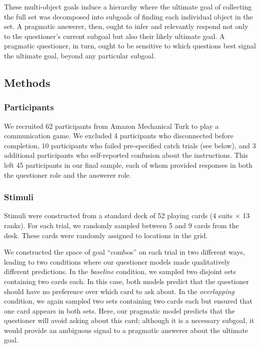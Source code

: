\documentclass[11pt, floatsintext]{apa6}
\begin{document}
These multi-object goals induce a hierarchy where the ultimate goal of collecting the full set was decomposed into subgoals of finding each individual object in the set.
A pragmatic answerer, then, ought to infer and relevantly respond not only to the questioner's current subgoal but also their likely ultimate goal.
A pragmatic questioner, in turn, ought to be sensitive to which questions best signal the ultimate goal, beyond any particular subgoal.


\subsection{Methods}
\subsubsection{Participants}

We recruited 62 participants from Amazon Mechanical Turk to play a communication game.
We excluded 4 participants who disconnected before completion, 10 participants who failed pre-specified catch trials (see below), and 3 additional participants who self-reported confusion about the instructions.
This left 45 participants in our final sample, each of whom provided responses in both the questioner role and the answerer role.

\subsubsection{Stimuli}

Stimuli were constructed from a standard deck of 52 playing cards (4 suits $\times$ 13 ranks). 
For each trial, we randomly sampled between 5 and 9 cards from the desk. 
These cards were randomly assigned to locations in the grid. 

We constructed the space of goal ``combos'' on each trial in two different ways, leading to two conditions where our questioner models made qualitatively different predictions.
In the \emph{baseline} condition, we sampled two disjoint sets containing two cards each. 
In this case, both models predict that the questioner should have no preference over which card to ask about.
In the \emph{overlapping} condition, we again sampled two sets containing two cards each but ensured that one card appears in both sets. 
Here, our pragmatic model predicts that the questioner will avoid asking about this card; although it is a necessary subgoal, it would provide an ambiguous signal to a pragmatic answerer about the ultimate goal.
\end{document}
